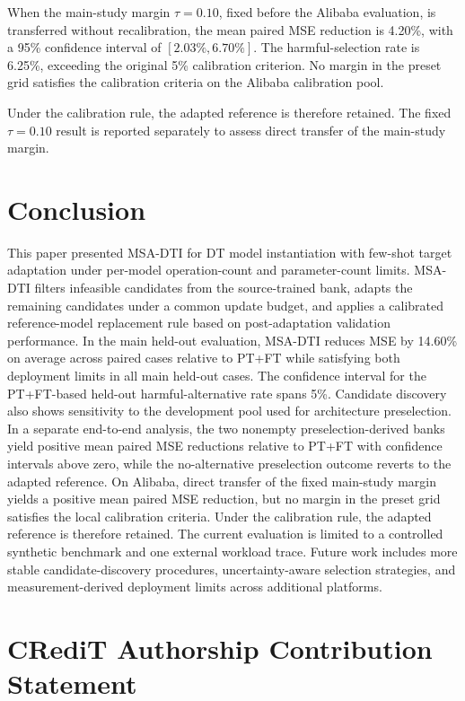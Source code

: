 \documentclass[a4paper,fleqn]{cas-sc}
\begin{document}
When the main-study margin $\tau=0.10$, fixed before the Alibaba evaluation,
is transferred without recalibration, the mean paired MSE reduction is
4.20\%, with a 95\% confidence interval of $[2.03\%,6.70\%]$. The
harmful-selection rate is 6.25\%, exceeding the original 5\% calibration
criterion. No margin in the preset grid satisfies the calibration criteria on
the Alibaba calibration pool.

Under the calibration rule, the adapted reference is therefore retained. The
fixed $\tau=0.10$ result is reported separately to assess direct transfer of
the main-study margin.

\section{Conclusion}
\label{sec:conclusion}

This paper presented MSA-DTI for DT model instantiation with few-shot target
adaptation under per-model operation-count and parameter-count limits. MSA-DTI filters
infeasible candidates from the source-trained bank, adapts the remaining
candidates under a common update budget, and applies a calibrated
reference-model replacement rule based on post-adaptation validation
performance. In the main held-out evaluation, MSA-DTI reduces MSE by 14.60\%
on average across paired cases relative to PT+FT while satisfying both
deployment limits in all main held-out cases. The confidence interval for the
PT+FT-based held-out harmful-alternative rate spans 5\%. Candidate
discovery also shows sensitivity to the development pool used for architecture
preselection. In a separate end-to-end analysis, the two nonempty
preselection-derived banks yield positive mean paired MSE reductions relative
to PT+FT with confidence intervals above zero, while the no-alternative
preselection outcome reverts to the adapted reference. On Alibaba, direct
transfer of the fixed main-study margin yields a positive mean paired MSE
reduction, but no margin in the preset grid satisfies the local calibration
criteria. Under the calibration rule, the adapted reference is therefore
retained. The current evaluation is limited to a controlled synthetic benchmark
and one external workload trace. Future work includes more stable
candidate-discovery procedures, uncertainty-aware selection strategies, and
measurement-derived deployment limits across additional platforms.

\section*{CRediT Authorship Contribution Statement}
\end{document}
